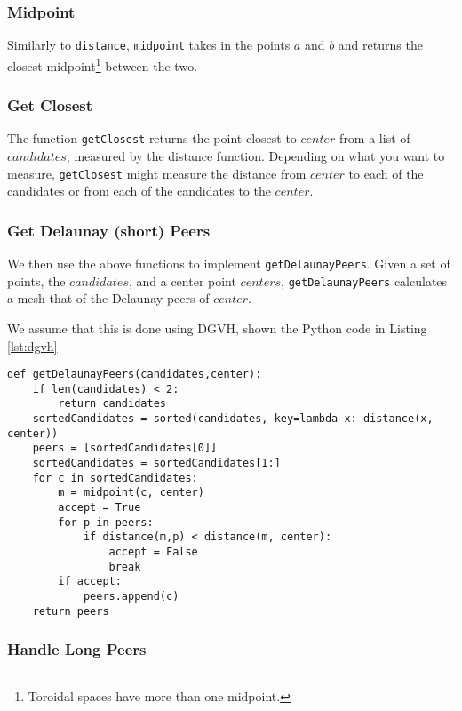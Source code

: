 \documentclass[11pt,conference]{IEEEtran}
\begin{document}
\subsubsection{Midpoint}

Similarly to \texttt{distance}, \texttt{midpoint} takes in the points $ a $ and $ b $ and returns the closest midpoint\footnote{Toroidal spaces have more than one midpoint.} between the two.

\subsubsection{Get Closest}
The function \texttt{getClosest} returns the point closest to $ center$ from a list of $ candidates$, measured by the distance function.
Depending on what you want to measure, \texttt{getClosest} might measure the distance from $ center$ to each of the candidates or from each of the candidates to the $ center$.

\subsubsection{Get Delaunay (short) Peers}
We then use the above functions to implement  \texttt{getDelaunayPeers}.
Given a set of points, the $ candidates$, and a center point $ centers$, \texttt{getDelaunayPeers} calculates a mesh that of the Delaunay peers of $ center$.

We assume that this is done using DGVH, shown the Python code 
in Listing \ref{lst:dgvh}


\begin{lstlisting}[basicstyle=\footnotesize\ttfamily,  breaklines=true, caption={\texttt{getDelaunayPeers()}}, label={lst:dgvh}, frame=single] 
def getDelaunayPeers(candidates,center):    
	if len(candidates) < 2:
		return candidates
	sortedCandidates = sorted(candidates, key=lambda x: distance(x, center))
	peers = [sortedCandidates[0]] 
	sortedCandidates = sortedCandidates[1:]
	for c in sortedCandidates:
		m = midpoint(c, center)
		accept = True
		for p in peers:
			if distance(m,p) < distance(m, center):  
				accept = False
				break
		if accept:
			peers.append(c)
	return peers
\end{lstlisting}


\subsubsection{Handle Long Peers}
\end{document}
